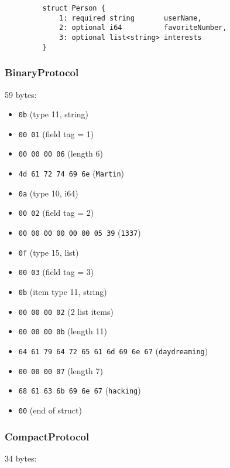 \documentclass[12pt, titlepage]{article}
\begin{document}
\begin{verbatim}
         struct Person {
             1: required string       userName,
             2: optional i64          favoriteNumber,
             3: optional list<string> interests
         }
\end{verbatim}

\subsubsection{BinaryProtocol}

59 bytes:

\begin{itemize}
    \item \texttt{0b} (type 11, string)
    \item \texttt{00 01} (field tag = 1)
    \item \texttt{00 00 00 06} (length 6)
    \item \texttt{4d 61 72 74 69 6e} (\texttt{Martin})
    \item \texttt{0a} (type 10, i64)
    \item \texttt{00 02} (field tag = 2)
    \item \texttt{00 00 00 00 00 00 05 39} (\texttt{1337})
    \item \texttt{0f} (type 15, list)
    \item \texttt{00 03} (field tag = 3)
    \item \texttt{0b} (item type 11, string)
    \item \texttt{00 00 00 02} (2 list items)
    \item \texttt{00 00 00 0b} (length 11)
    \item \texttt{64 61 79 64 72 65 61 6d 69 6e 67} (\texttt{daydreaming})
    \item \texttt{00 00 00 07} (length 7)
    \item \texttt{68 61 63 6b 69 6e 67} (\texttt{hacking})
    \item \texttt{00} (end of struct)
\end{itemize}

\subsubsection{CompactProtocol}

34 bytes:
\end{document}
